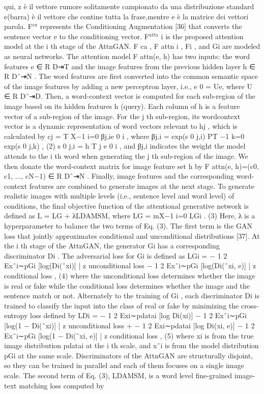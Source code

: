 qui, z è il vettore rumore solitamente campionato da una distribuzione standard
 e(barra) è il vettore che contine tutta la frase,mentre  e è
la matrice dei vettori parola. 
F$^{ca}$ represents the Conditioning
Augmentation [36] that converts the sentence vector e to the
conditioning vector. F$^{attn}$
i
is the proposed attention model
at the i
th stage of the AttnGAN. F
ca
, F
attn
i
, Fi
, and Gi are
modeled as neural networks.
The attention model F
attn(e, h) has two inputs: the
word features e ∈ R
D⇥T
and the image features from the
previous hidden layer h ∈ R
Dˆ⇥N . The word features are
first converted into the common semantic space of the image features by adding a new perceptron layer, i.e., e
0 = Ue,
where U ∈ R
Dˆ⇥D. Then, a word-context vector is computed for each sub-region of the image based on its hidden
features h (query). Each column of h is a feature vector of
a sub-region of the image. For the j
th sub-region, its wordcontext vector is a dynamic representation of word vectors
relevant to hj , which is calculated by
cj =
T
X−1
i=0
βj,ie
0
i
, where βj,i =
exp(s
0
j,i)
PT −1
k=0 exp(s
0
j,k)
, (2)
s
0
j,i = h
T
j
e
0
i
, and βj,i indicates the weight the model attends
to the i
th word when generating the j
th sub-region of the
image. We then donate the word-context matrix for image
feature set h by F
attn(e, h)=(c0, c1, ..., cN−1) ∈ R
Dˆ⇥N .
Finally, image features and the corresponding word-context
features are combined to generate images at the next stage.
To generate realistic images with multiple levels (i.e.,
sentence level and word level) of conditions, the final objective function of the attentional generative network is defined
as
L = LG + λLDAMSM, where LG =
mX−1
i=0
LGi
. (3)
Here, λ is a hyperparameter to balance the two terms of
Eq. (3). The first term is the GAN loss that jointly approximates conditional and unconditional distributions [37]. At
the i
th stage of the AttnGAN, the generator Gi has a corresponding discriminator Di
. The adversarial loss for Gi
is
defined as
LGi = −
1
2
Exˆi∼pGi
[log(Di(ˆxi)]
| {z }
unconditional loss
−
1
2
Exˆi∼pGi
[log(Di(ˆxi, e)]
| {z }
conditional loss
,
(4)
where the unconditional loss determines whether the image
is real or fake while the conditional loss determines whether
the image and the sentence match or not.
Alternately to the training of Gi
, each discriminator Di
is trained to classify the input into the class of real or fake
by minimizing the cross-entropy loss defined by
LDi = −
1
2
Exi∼pdatai
[log Di(xi)] −
1
2
Exˆi∼pGi
[log(1 − Di(ˆxi)]
| {z }
unconditional loss
+
−
1
2
Exi∼pdatai
[log Di(xi, e)] −
1
2
Exˆi∼pGi
[log(1 − Di(ˆxi, e)]
| {z }
conditional loss
,
(5)
where xi
is from the true image distribution pdatai
at the
i
th scale, and xˆi
is from the model distribution pGi
at the
same scale. Discriminators of the AttnGAN are structurally
disjoint, so they can be trained in parallel and each of them
focuses on a single image scale.
The second term of Eq. (3), LDAMSM, is a word level
fine-grained image-text matching loss computed by
